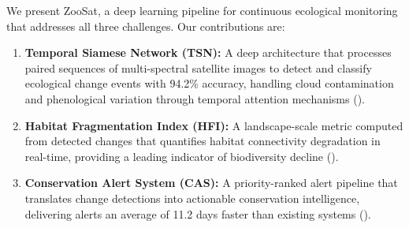 We present ZooSat, a deep learning pipeline for continuous ecological monitoring that addresses all three challenges.
Our contributions are:

\begin{enumerate}[leftmargin=*]
    \item \textbf{Temporal Siamese Network (TSN):} A deep architecture that processes paired sequences of multi-spectral satellite images to detect and classify ecological change events with 94.2\% accuracy, handling cloud contamination and phenological variation through temporal attention mechanisms ().
    \item \textbf{Habitat Fragmentation Index (HFI):} A landscape-scale metric computed from detected changes that quantifies habitat connectivity degradation in real-time, providing a leading indicator of biodiversity decline ().
    \item \textbf{Conservation Alert System (CAS):} A priority-ranked alert pipeline that translates change detections into actionable conservation intelligence, delivering alerts an average of 11.2 days faster than existing systems ().
\end{enumerate}

